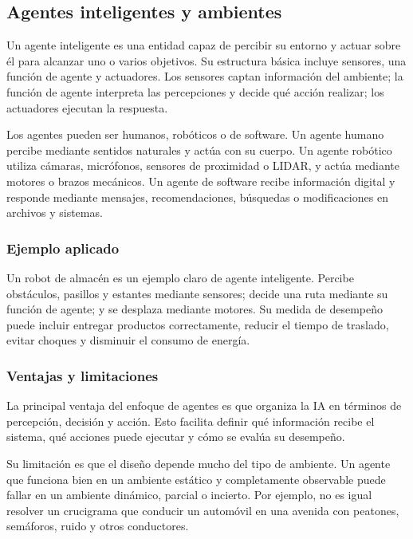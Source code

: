 \subsection{Agentes inteligentes y ambientes}

Un agente inteligente es una entidad capaz de percibir su entorno y actuar sobre él para alcanzar uno o varios objetivos. Su estructura básica incluye sensores, una función de agente y actuadores. Los sensores captan información del ambiente; la función de agente interpreta las percepciones y decide qué acción realizar; los actuadores ejecutan la respuesta.

Los agentes pueden ser humanos, robóticos o de software. Un agente humano percibe mediante sentidos naturales y actúa con su cuerpo. Un agente robótico utiliza cámaras, micrófonos, sensores de proximidad o LIDAR, y actúa mediante motores o brazos mecánicos. Un agente de software recibe información digital y responde mediante mensajes, recomendaciones, búsquedas o modificaciones en archivos y sistemas.

\subsubsection{Ejemplo aplicado}

Un robot de almacén es un ejemplo claro de agente inteligente. Percibe obstáculos, pasillos y estantes mediante sensores; decide una ruta mediante su función de agente; y se desplaza mediante motores. Su medida de desempeño puede incluir entregar productos correctamente, reducir el tiempo de traslado, evitar choques y disminuir el consumo de energía.

\subsubsection{Ventajas y limitaciones}

La principal ventaja del enfoque de agentes es que organiza la IA en términos de percepción, decisión y acción. Esto facilita definir qué información recibe el sistema, qué acciones puede ejecutar y cómo se evalúa su desempeño.

Su limitación es que el diseño depende mucho del tipo de ambiente. Un agente que funciona bien en un ambiente estático y completamente observable puede fallar en un ambiente dinámico, parcial o incierto. Por ejemplo, no es igual resolver un crucigrama que conducir un automóvil en una avenida con peatones, semáforos, ruido y otros conductores.

